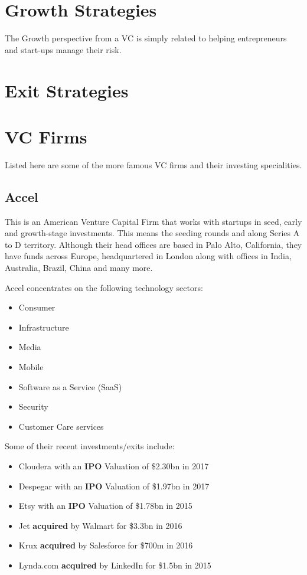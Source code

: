 \documentclass[a4paper]{article}
\begin{document}
{\newpage
\section{Growth Strategies}
The Growth perspective from a VC is simply related to helping entrepreneurs and start-ups manage their risk. 

\newpage
\section{Exit Strategies}
\Blindtext

\newpage
\appendix
\section{VC Firms}
Listed here are some of the more famous VC firms and their investing specialities.

\subsection{Accel}
This is an American Venture Capital Firm that works with startups in seed, early and growth-stage investments. This means the seeding rounds and along Series A to D territory. Although their head offices are based in Palo Alto, California, they have funds across Europe, headquartered in London along with offices in India, Australia, Brazil, China and many more.

\vspace{5pt}
\noindent Accel concentrates on the following technology sectors:
\begin{itemize}
	\item Consumer
	\item Infrastructure
	\item Media
	\item Mobile
	\item Software as a Service (SaaS)
	\item Security
	\item Customer Care services
\end{itemize}
\vspace{5pt}
\noindent Some of their recent investments/exits include:
\begin{itemize}
	\item Cloudera with an \textbf{IPO} Valuation of \$2.30bn in 2017
	\item Despegar with an \textbf{IPO} Valuation of \$1.97bn in 2017
	\item Etsy with an \textbf{IPO} Valuation of \$1.78bn in 2015
	\item Jet \textbf{acquired} by Walmart for \$3.3bn in 2016
	\item Krux \textbf{acquired} by Salesforce for \$700m in 2016
	\item Lynda.com \textbf{acquired} by LinkedIn for \$1.5bn in 2015
\end{itemize}

}
\end{document}
